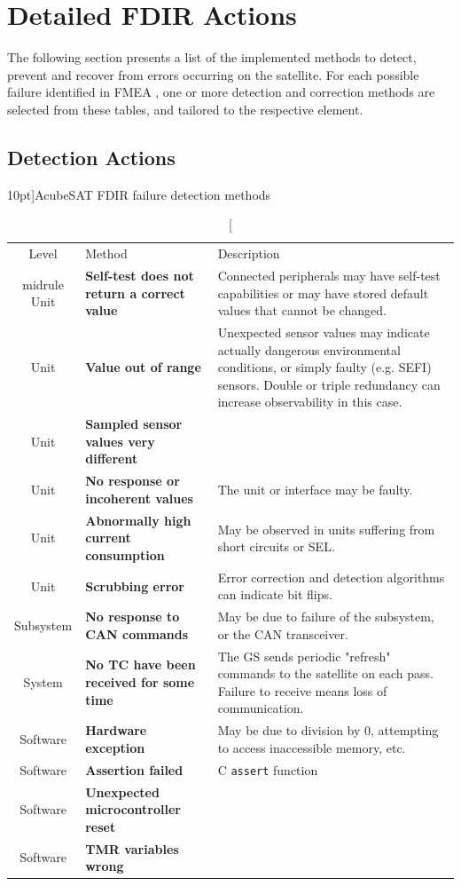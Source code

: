 \documentclass[a4paper,nobib]{tufte-book}
\begin{document}
\FloatBarrier
\section{Detailed \acs{FDIR} Actions}

The following section presents a list of the implemented methods to detect, prevent and recover from errors occurring on the satellite. For each possible failure identified in \acs{FMEA} \autocite{retselis_acubesat_fmea_2020}, one or more detection and correction methods are selected from these tables, and tailored to the respective element.


\clearpage
\subsection{Detection Actions}
\begin{table}[h]
	\centering
	\caption[][10pt]{AcubeSAT \acs{FDIR} failure detection methods}
	\label{tab:fdir_detect}
	\renewcommand{\arraystretch}{1.3}
	\begin{tabularx}{\textwidth}{@{}cL{5cm}X@{}}
		\toprule
		Level & Method & Description \\midrule
		Unit & \textbf{Self-test does not return a correct value} & Connected peripherals may have self-test capabilities or may have stored default values that cannot be changed. \\
		Unit & \textbf{Value out of range} & Unexpected sensor values may indicate actually dangerous environmental conditions, or simply faulty (e.g. \acs{SEFI}) sensors. Double or triple redundancy can increase observability in this case. \\
		Unit & \textbf{Sampled sensor values very different} & \\
		Unit & \textbf{No response or incoherent values} & The unit or interface may be faulty. \\
		Unit & \textbf{Abnormally high current consumption} & May be observed in units suffering from short circuits or \acs{SEL}. \\
		Unit & \textbf{Scrubbing error} & Error correction and detection algorithms can indicate bit flips. \\
		Subsystem & \textbf{No response to \acs{CAN} commands} & May be due to failure of the subsystem, or the \acs{CAN} transceiver. \\
		System & \textbf{No \acs{TC} have been received for some time} & The \acs{GS} sends periodic "refresh" commands to the satellite on each pass. Failure to receive means loss of communication. \\
		Software & \textbf{Hardware exception} & May be due to division by 0, attempting to access inaccessible memory, etc. \\
		Software & \textbf{Assertion failed} & C \texttt{assert} function \\
		Software & \textbf{Unexpected microcontroller reset} & \\
		Software & \textbf{\acs{TMR} variables wrong} & \\ \bottomrule
	\end{tabularx}
\end{table}
\end{document}
